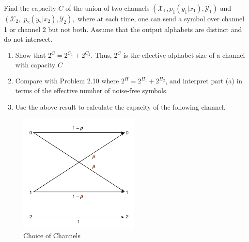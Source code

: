 \begin{exercise}{Find the capacity $C$ of the union of two channels $\left(\mathcal{X}_{1}, p_{1}\left(y_{1} | x_{1}\right), \mathcal{Y}_{1}\right)$ and $\left(\mathcal{X}_{2},\right.$ $\left. p_{2}\left(y_{2} | x_{2}\right), \mathcal{Y}_{2}\right),$ where at each   time, one can send a symbol over channel 1 or channel 2 but not both. Assume that the output alphabets are distinct and do not intersect.
  \begin{enumerate}
    \item Show that $2^{C}=2^{C_{1}}+2^{C_{2}} .$ Thus, $2^{C}$ is the effective alphabet size of a channel with capacity $C$
    \item Compare with Problem 2.10 where $2^{H}=2^{H_{1}}+2^{H_{2}}$, and interpret part (a) in terms of the effective number of noise-free symbols.
    \item Use the above result to calculate the capacity of the following channel.
  \end{enumerate}
  \begin{figure}[H]
    \centering
    \includegraphics[height=6cm]{img/7-2.png}
    \caption{Choice of Channels}
    \label{fig:ex6}
  \end{figure}
  
}
\end{exercise}
